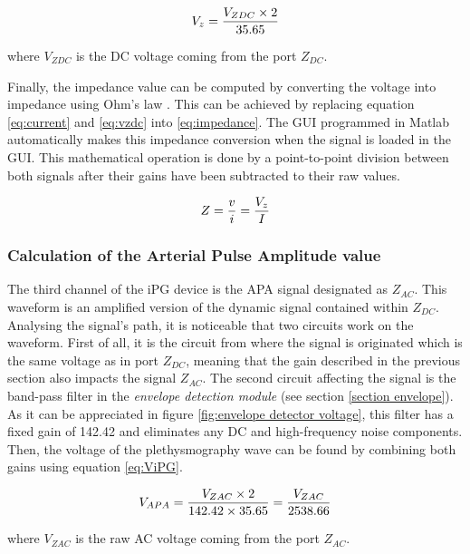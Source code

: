 \begin{align}
	\label{eq:vzdc}
	V_z = \frac{V_{ZDC} \times 2}{35.65} \tagaddtext{[\si{\volt}]}
\end{align}

where $V_{ZDC}$ is the DC voltage coming from the port $Z_{DC}$.

Finally, the impedance value can be computed by converting the voltage into impedance using Ohm's law \cite{ohm1827galvanische}. This can be achieved by replacing equation \ref{eq:current} and \ref{eq:vzdc} into \ref{eq:impedance}. The GUI programmed in Matlab automatically makes this impedance conversion when the signal is loaded in the GUI. This mathematical operation is done by a point-to-point division between both signals after their gains have been subtracted to their raw values. 

\begin{align}
	\label{eq:impedance}
	Z = \frac{v}{i}=\frac{V_z}{I} \tagaddtext{[\si{\ohm}]}
\end{align}

\subsubsection{Calculation of the Arterial Pulse Amplitude value}
The third channel of the iPG device is the APA signal designated as $Z_{AC}$. This waveform is an amplified version of the dynamic signal contained within $Z_{DC}$. Analysing the signal's path, it is noticeable that two circuits work on the waveform. First of all, it is the circuit from where the signal is originated which is the same voltage as in port $Z_{DC}$, meaning that the gain described in the previous section also impacts the signal $Z_{AC}$. The second circuit affecting the signal is the band-pass filter in the \textit{envelope detection module} (see section \ref{section envelope}). As it can be appreciated in figure \ref{fig:envelope detector voltage}, this filter has a fixed gain of \num{142.42} and eliminates any DC and high-frequency noise components. Then, the voltage of the plethysmography wave can be found by combining both gains using equation \ref{eq:ViPG}.

\begin{align}
	\label{eq:ViPG}
	V_{APA} = \frac{V_{ZAC} \times 2}{142.42 \times 35.65}=\frac{V_{ZAC}}{2538.66} \tagaddtext{[\si{\volt}]}
\end{align}

where $V_{ZAC}$ is the raw AC voltage coming from the port $Z_{AC}$.

